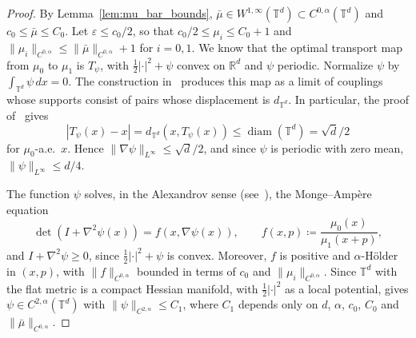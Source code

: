 \documentclass[11pt]{article}
\numberwithin{equation}{section}
\theoremstyle{definition}
\newcommand{\R}{\mathbb{R}}
\newcommand{\T}{\mathbb{T}}
\begin{document}
\begin{proof}
    By Lemma~\ref{lem:mu_bar_bounds}, $\bar\mu \in W^{1,\infty}(\T^d) \subset C^{0,\alpha}(\T^d)$ and $c_0 \le \bar\mu \le C_0$.
    Let $\varepsilon \le c_0/2$, so that $c_0/2 \le \mu_i \le C_0 + 1$ and $\|\mu_i\|_{C^{0,\alpha}} \le \|\bar\mu\|_{C^{0,\alpha}} + 1$ for $i = 0,1$.
    We know that the optimal transport map from $\mu_0$ to $\mu_1$ is $T_\psi$, with $\frac{1}{2}|\cdot|^2 + \psi$ convex on $\R^d$ and $\psi$ periodic.
    Normalize $\psi$ by $\int_{\T^d}\psi\,dx = 0$.
    The construction in~\cite{cordero1999transport} produces this map as a limit of couplings whose supports consist of pairs whose displacement is $d_{\T^d}$.
    In particular, the proof of~\cite[Thm.~1]{cordero1999transport} gives
    \begin{equation}
        \label{eq:displacement_realizes_distance}
        |T_\psi(x) - x| = d_{\T^d}\left(x, T_\psi(x)\right) \le \operatorname{diam}(\T^d) = \sqrt{d}/2
    \end{equation}
    for $\mu_0$-a.e.\ $x$.
    Hence $\|\nabla\psi\|_{L^\infty} \le \sqrt{d}/2$, and since $\psi$ is periodic with zero mean, $\|\psi\|_{L^\infty} \le d/4$.

    The function $\psi$ solves, in the Alexandrov sense (see~\cite[\S4]{cordero1999transport}), the Monge--Amp\`ere equation
    \[
    \det\left(I + \nabla^2\psi(x)\right) = f\left(x, \nabla\psi(x)\right), \qquad f(x,p) \coloneqq \frac{\mu_0(x)}{\mu_1(x+p)},
    \]
    and $I + \nabla^2\psi \ge 0$, since $\frac{1}{2}|\cdot|^2 + \psi$ is convex.
    Moreover, $f$ is positive and $\alpha$-H\"older in $(x,p)$, with $\|f\|_{C^{0,\alpha}}$ bounded in terms of $c_0$ and $\|\mu_i\|_{C^{0,\alpha}}$.
    Since $\T^d$ with the flat metric is a compact Hessian manifold, with $\frac{1}{2}|\cdot|^2$ as a local potential, \cite[Thm.~5]{CaffarelliViaclovsky2001} gives $\psi \in C^{2,\alpha}(\T^d)$ with $\|\psi\|_{C^{2,\alpha}} \le C_1$, where $C_1$ depends only on $d$, $\alpha$, $c_0$, $C_0$ and $\|\bar\mu\|_{C^{0,\alpha}}$.


\end{proof}
\end{document}
